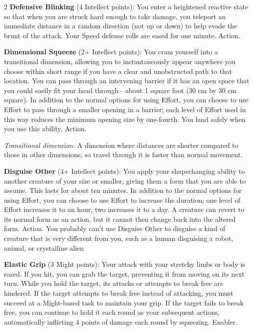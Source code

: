 \begin{multicols}{2}
\textbf{Defensive Blinking} (4 Intellect points): You enter a heightened reactive state so that when you are struck hard enough to take damage, you teleport an immediate distance in a random direction (not up or down) to help evade the brunt of the attack. Your Speed defense rolls are eased for one minute. Action.

\textbf{Dimensional Squeeze} (2+ Intellect points): You cram yourself into a transitional dimension, allowing you to instantaneously appear anywhere you choose within short range if you have a clear and unobstructed path to that location. You can pass through an intervening barrier if it has an open space that you could easily fit your head through—about 1 square foot (30 cm by 30 cm square). In addition to the normal options for using Effort, you can choose to use Effort to pass through a smaller opening in a barrier; each level of Effort used in this way reduces the minimum opening size by one-fourth. You land safely when you use this ability. Action.

\textit{Transitional dimension}: A dimension where distances are shorter compared to those in other dimensions, so travel through it is faster than normal movement.

\textbf{Disguise Other} (4+ Intellect points): You apply your shapechanging ability to another creature of your size or smaller, giving them a form that you are able to assume. This lasts for about ten minutes.
In addition to the normal options for using Effort, you can choose to use Effort to increase the duration; one level of Effort increases it to an hour, two increases it to a day. A creature can revert to its normal form as an action, but it cannot then change back into the altered form. Action.
 You probably can’t use Disguise Other to disguise a kind of creature that is very different from you, such as a human disguising a robot, animal, or crystalline alien

\textbf{Elastic Grip} (3 Might points): Your attack with your stretchy limbs or body is eased. If you hit, you can grab the target, preventing it from moving on its next turn. While you hold the target, its attacks or attempts to break free are hindered. If the target attempts to break free instead of attacking, you must succeed at a Might-based task to maintain your grip. If the target fails to break free, you can continue to hold it each round as your subsequent actions, automatically inflicting 4 points of damage each round by squeezing. Enabler.


\end{multicols}
